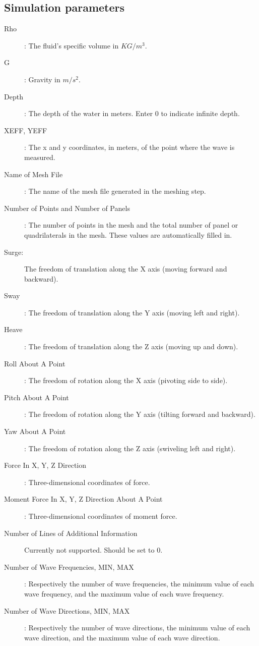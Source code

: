 \documentclass[12pt]{article}
\begin{document}
\subsection{Simulation parameters}

\begin{description}
	\item []
	\item [Rho]: The fluid's specific volume in $KG/m^3$.
\item [G]: Gravity in $m/s^2$.
\item [Depth]: The depth of the water in meters. Enter 0 to indicate infinite depth.
\item [XEFF, YEFF]: The x and y coordinates, in meters, of the point where the wave is measured.
\item [Name of Mesh File]: The name of the mesh file generated in the meshing step.
\item [Number of Points and Number of Panels]: The number of points in the mesh and the total number of panel or quadrilaterals in the mesh. These values are automatically filled in.
\item [Surge:] The freedom of translation along the X axis (moving forward and backward).
\item [Sway]: The freedom of translation along the Y axis (moving left and right).
\item [Heave]: The freedom of translation along the Z axis (moving up and down).
\item [Roll About A Point]: The freedom of rotation along the X axis (pivoting side to side).
\item [Pitch About A Point]: The freedom of rotation along the Y axis (tilting forward and backward).
\item [Yaw About A Point]: The freedom of rotation along the Z axis (swiveling left and right). 
\item [Force In X, Y, Z Direction]: Three-dimensional coordinates of force.
\item [Moment Force In X, Y, Z Direction About A Point]: Three-dimensional coordinates of moment force.
\item [Number of Lines of Additional Information] Currently not supported. Should be set to 0.
\item [Number of Wave Frequencies, MIN, MAX]: Respectively the number of wave frequencies, the minimum value of each wave frequency, and the maximum value of each wave frequency.
\item [Number of Wave Directions, MIN, MAX]: Respectively the number of wave directions, the minimum value of each wave direction, and the maximum value of each wave direction.



\end{description}
\end{document}
